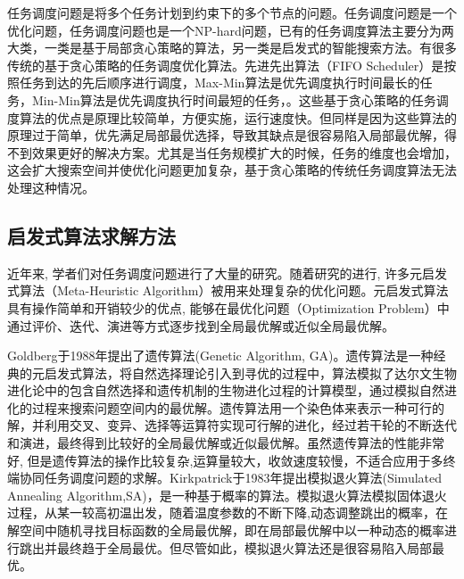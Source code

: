 任务调度问题是将多个任务计划到约束下的多个节点的问题。任务调度问题是一个优化问题，任务调度问题也是一个NP-hard问题\cite{tawfeek2013cloud}，已有的任务调度算法主要分为两大类，一类是基于局部贪心策略的算法，另一类是启发式的智能搜索方法。有很多传统的基于贪心策略的任务调度优化算法\cite{乔楠楠2017一种面向网络边缘任务调度问题的多方向粒子群优化算法}。先进先出算法（FIFO Scheduler）是按照任务到达的先后顺序进行调度\cite{zaharia2009job}，Max-Min算法是优先调度执行时间最长的任务，Min-Min算法是优先调度执行时间最短的任务，\cite{tabak2014improving,杜玉霞2010Min}。这些基于贪心策略的任务调度算法的优点是原理比较简单，方便实施，运行速度快。但同样是因为这些算法的原理过于简单，优先满足局部最优选择，导致其缺点是很容易陷入局部最优解，得不到效果更好的解决方案。尤其是当任务规模扩大的时候，任务的维度也会增加，这会扩大搜索空间并使优化问题更加复杂，基于贪心策略的传统任务调度算法无法处理这种情况。


\subsection{启发式算法求解方法}

近年来, 学者们对任务调度问题进行了大量的研究。随着研究的进行, 许多元启发式算法（Meta-Heuristic Algorithm）被用来处理复杂的优化问题。元启发式算法具有操作简单和开销较少的优点, 能够在最优化问题（Optimization Problem）中通过评价、迭代、演进等方式逐步找到全局最优解或近似全局最优解。

Goldberg于1988年提出了遗传算法(Genetic Algorithm, GA)\cite{fonseca1995overview,whitley1994genetic,tanese1989distributed,Nagham2018}。遗传算法是一种经典的元启发式算法，将自然选择理论引入到寻优的过程中，算法模拟了达尔文生物进化论中的包含自然选择和遗传机制的生物进化过程的计算模型，通过模拟自然进化的过程来搜索问题空间内的最优解。遗传算法用一个染色体来表示一种可行的解，并利用交叉、变异、选择等运算符实现可行解的进化，经过若干轮的不断迭代和演进，最终得到比较好的全局最优解或近似最优解。虽然遗传算法的性能非常好, 但是遗传算法的操作比较复杂,运算量较大，收敛速度较慢，不适合应用于多终端协同任务调度问题的求解。Kirkpatrick于1983年提出模拟退火算法(Simulated Annealing Algorithm,SA)，是一种基于概率的算法。模拟退火算法模拟固体退火过程，从某一较高初温出发，随着温度参数的不断下降,动态调整跳出的概率，在解空间中随机寻找目标函数的全局最优解，即在局部最优解中以一种动态的概率进行跳出并最终趋于全局最优\cite{kirkpatrick1983optimization,Hong1991A,rutenbar1989simulated}。但尽管如此，模拟退火算法还是很容易陷入局部最优。


